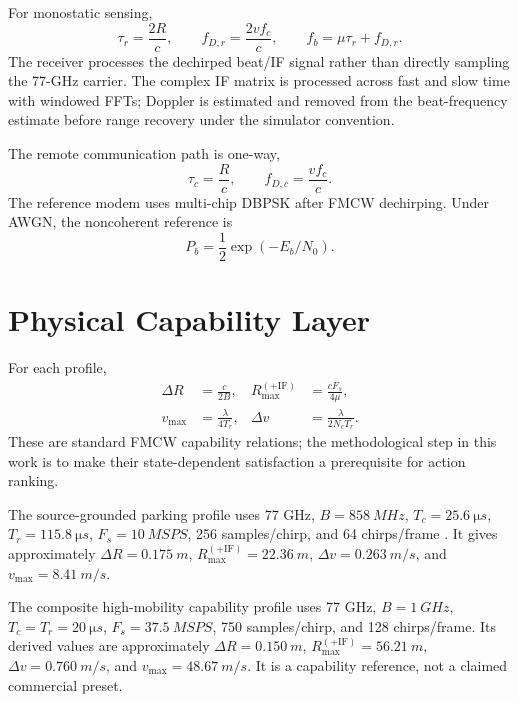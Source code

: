 \documentclass[journal]{IEEEtran}
\begin{document}
For monostatic sensing,
\begin{equation}
\tau_r=\frac{2R}{c},\qquad f_{D,r}=\frac{2vf_c}{c},\qquad f_b=\mu\tau_r+f_{D,r}.
\end{equation}
The receiver processes the dechirped beat/IF signal rather than directly sampling the 77-GHz carrier. The complex IF matrix is processed across fast and slow time with windowed FFTs; Doppler is estimated and removed from the beat-frequency estimate before range recovery under the simulator convention.

The remote communication path is one-way,
\begin{equation}
\tau_c=\frac{R}{c},\qquad f_{D,c}=\frac{vf_c}{c}.
\end{equation}
The reference modem uses multi-chip DBPSK after FMCW dechirping. Under AWGN, the noncoherent reference is
\begin{equation}
P_b=\frac{1}{2}\exp(-E_b/N_0).
\end{equation}

\section{Physical Capability Layer}
For each profile,
\begin{align}
\Delta R &= \frac{c}{2B}, & R_{\max}^{(+\mathrm{IF})} &= \frac{cF_s}{4\mu},\\
v_{\max} &= \frac{\lambda}{4T_r}, & \Delta v &= \frac{\lambda}{2N_cT_r}.
\end{align}
These are standard FMCW capability relations; the methodological step in this work is to make their state-dependent satisfaction a prerequisite for action ranking.

The source-grounded parking profile uses 77 GHz, $B=\SI{858}{MHz}$, $T_c=\SI{25.6}{\micro s}$, $T_r=\SI{115.8}{\micro s}$, $F_s=\SI{10}{MSPS}$, 256 samples/chirp, and 64 chirps/frame \cite{tiParking}. It gives approximately $\Delta R=\SI{0.175}{m}$, $R_{\max}^{(+\mathrm{IF})}=\SI{22.36}{m}$, $\Delta v=\SI{0.263}{m/s}$, and $v_{\max}=\SI{8.41}{m/s}$.

The composite high-mobility capability profile uses 77 GHz, $B=\SI{1}{GHz}$, $T_c=T_r=\SI{20}{\micro s}$, $F_s=\SI{37.5}{MSPS}$, 750 samples/chirp, and 128 chirps/frame. Its derived values are approximately $\Delta R=\SI{0.150}{m}$, $R_{\max}^{(+\mathrm{IF})}=\SI{56.21}{m}$, $\Delta v=\SI{0.760}{m/s}$, and $v_{\max}=\SI{48.67}{m/s}$. It is a capability reference, not a claimed commercial preset.
\end{document}
